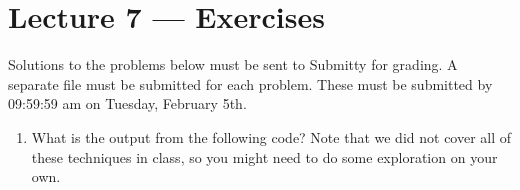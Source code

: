 \documentclass[letterpaper,10pt,english]{sphinxmanual}
\begin{document}
\chapter{Lecture 7 — Exercises}
\label{\detokenize{lecture_notes/lec07_modules_images_exercises/exercises:lecture-7-exercises}}\label{\detokenize{lecture_notes/lec07_modules_images_exercises/exercises::doc}}
Solutions to the problems below must be sent to Submitty for grading.
A separate file must be submitted for each problem. These must be
submitted by 09:59:59 am on Tuesday, February 5th.
\begin{enumerate}
\def\theenumi{\arabic{enumi}}
\def\labelenumi{\theenumi .}
\makeatletter\def\p@enumii{\p@enumi \theenumi .}\makeatother
\item {} 
What is the output from the following code?  Note that we did not
cover all of these techniques in class, so you might need to do
some exploration on your own.

\begin{sphinxVerbatim}[commandchars=\\\{\}]
 
     \PYG{p}{[}\PYG{p}{]}  \PYG{p}{[}\PYG{p}{]}
         \PYG{p}{[}\PYG{p}{]} \PYG{p}{[}\PYG{p}{]}
         

   
    
    
\PYG{p}{[}\PYG{p}{]}  \PYG{p}{[}\PYG{p}{]}
  
\PYG{p}{[}\PYG{p}{]}  \PYG{p}{[}\PYG{p}{]}
  
\end{sphinxVerbatim}


\end{enumerate}
\end{document}
